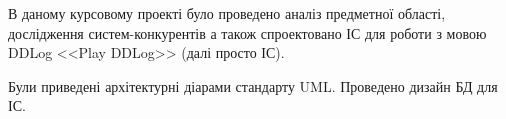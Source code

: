 В даному курсовому проекті було проведено аналіз предметної області, дослідження систем-конкурентів а також спроектовано ІС для роботи з мовою DDLog <<Play DDLog>> (далі просто ІС).

Були приведені архітектурні діарами стандарту UML. Проведено дизайн БД для ІС.